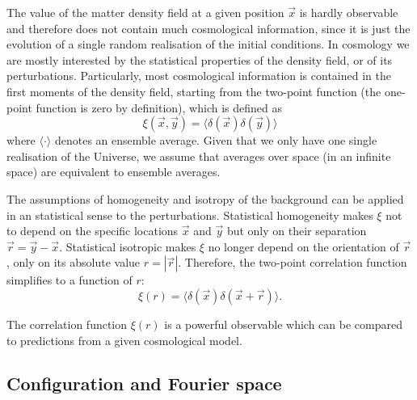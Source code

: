     The value of the matter density field at a given position $\vec{x}$ is 
    hardly observable and therefore does not contain much cosmological 
    information, since it is just the evolution of a single random 
    realisation of the initial conditions. In cosmology we are mostly 
    interested by the statistical properties of the density field, or 
    of its perturbations. Particularly, most cosmological information is
    contained in the first moments of the density field, starting from the
    two-point function (the one-point function is zero by definition),
    which is defined as
    \begin{equation}
        \xi(\vec{x}, \vec{y}) = \langle \delta(\vec{x}) \delta(\vec{y})\rangle 
        \label{eq:two_point_function_config_space}
    \end{equation}
    where $\langle \cdot \rangle$ denotes an ensemble average. Given that
    we only have one single realisation of the Universe, we assume that
    averages over space (in an infinite space) are equivalent to ensemble averages.

    The assumptions of homogeneity and isotropy of the background can be 
    applied in an statistical sense to the perturbations. Statistical 
    homogeneity makes $\xi$ not to depend on the specific locations $\vec{x}$
    and $\vec{y}$ but only on their separation $\vec{r} = \vec{y}-\vec{x}$. 
    Statistical isotropic makes $\xi$ no longer depend on the orientation of
    $\vec{r}$, only on its absolute value $r = |\vec{r}|$. 
    Therefore, the two-point correlation function simplifies to a function of $r$:
    \begin{equation}
        \xi(r) = \langle \delta(\vec{x}) \delta(\vec{x}+\vec{r})\rangle. 
        \label{eq:two_point_function_config_space_iso_homo}
    \end{equation}
    
    The correlation function $\xi(r)$ is a powerful observable which can 
    be compared to predictions from a given cosmological model. 

    
    \subsection{Configuration and Fourier space}
    \label{intro:lss:config_fourier}

